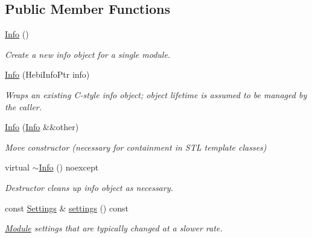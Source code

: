 \subsection*{Public Member Functions}
\begin{DoxyCompactItemize}
\item 
\mbox{\label{classhebi_1_1Info_a3d7965dca75a442e1e67c6623df8949e}} 
\hyperlink{classhebi_1_1Info_a3d7965dca75a442e1e67c6623df8949e}{Info} ()
\begin{DoxyCompactList}\small\item\em Create a new info object for a single module. \end{DoxyCompactList}\item 
\hyperlink{classhebi_1_1Info_aa0b53c4d5b50d020197b10265e7d4040}{Info} (Hebi\+Info\+Ptr info)
\begin{DoxyCompactList}\small\item\em Wraps an existing C-\/style info object; object lifetime is assumed to be managed by the caller. \end{DoxyCompactList}\item 
\mbox{\label{classhebi_1_1Info_a3e41324a9797031b0b4a5e8303cf5fe3}} 
\hyperlink{classhebi_1_1Info_a3e41324a9797031b0b4a5e8303cf5fe3}{Info} (\hyperlink{classhebi_1_1Info}{Info} \&\&other)
\begin{DoxyCompactList}\small\item\em Move constructor (necessary for containment in S\+TL template classes) \end{DoxyCompactList}\item 
\mbox{\label{classhebi_1_1Info_aaee3a5f528ad0a69c2f9fcd42bba47f5}} 
virtual \hyperlink{classhebi_1_1Info_aaee3a5f528ad0a69c2f9fcd42bba47f5}{$\sim$\+Info} () noexcept
\begin{DoxyCompactList}\small\item\em Destructor cleans up info object as necessary. \end{DoxyCompactList}\item 
\mbox{\label{classhebi_1_1Info_a164840805c9084cccb068af37c740f5e}} 
const \hyperlink{classhebi_1_1Info_1_1Settings}{Settings} \& \hyperlink{classhebi_1_1Info_a164840805c9084cccb068af37c740f5e}{settings} () const
\begin{DoxyCompactList}\small\item\em \hyperlink{classhebi_1_1Module}{Module} settings that are typically changed at a slower rate. \end{DoxyCompactList}\item 

\end{DoxyCompactItemize}
